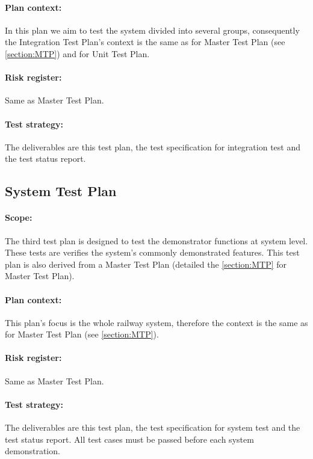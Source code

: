 \paragraph{Plan context:} In this plan we aim to test the system divided into several groups, consequently the Integration Test Plan's context is the same as for Master Test Plan (see \autoref{section:MTP}) and for Unit Test Plan.
\paragraph{Risk register:} Same as Master Test Plan.
\paragraph{Test strategy:} The deliverables are this test plan, the test specification for integration test and the test status report. 


\subsection{System Test Plan}\label{ssection:STP}
\paragraph{Scope:} The third test plan is designed to test the demonstrator functions at system level. These tests are verifies the system's commonly demonstrated features. This test plan is also derived from a Master Test Plan (detailed the \autoref{section:MTP} for Master Test Plan). 
\paragraph{Plan context:} This plan's focus is the whole railway system, therefore the context is the same as for Master Test Plan (see \autoref{section:MTP}).
\paragraph{Risk register:} Same as Master Test Plan.
\paragraph{Test strategy:} The deliverables are this test plan, the test specification for system test and the test status report. All test cases must be passed before each system demonstration.


